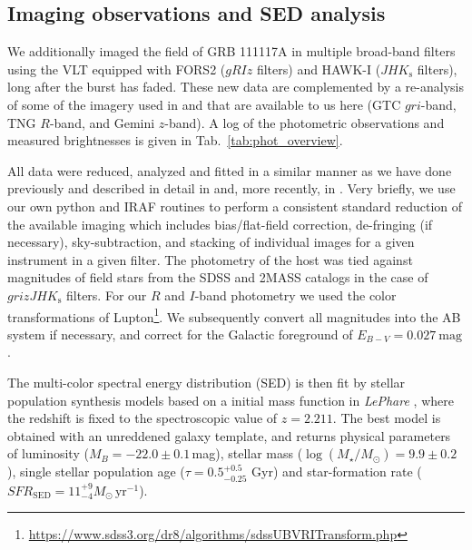 \documentclass{aa}    %
\begin{document}


\subsection{Imaging observations and SED analysis} \label{SED}

We additionally imaged the field of GRB 111117A in multiple broad-band filters
using the VLT equipped with FORS2 ($gRIz$ filters) and HAWK-I
($JHK_{\mathrm{s}}$ filters), long after the burst has faded. These new data are
complemented by a re-analysis of some of the imagery used in
\citet{Margutti2012} and \citet{Sakamoto2013} that are available to us here (GTC
$gri$-band, TNG $R$-band, and Gemini $z$-band). A log of the photometric
observations and measured brightnesses is given in Tab.~\ref{tab:phot_overview}.

All data were reduced, analyzed and fitted in a similar manner as we have done
previously and described in detail in \citet{Kruhler2011a} and, more recently,
in \citet{Schulze2016}. Very briefly, we use our own python and IRAF routines to
perform a consistent standard reduction of the available imaging which includes
bias/flat-field correction, de-fringing (if necessary), sky-subtraction, and
stacking of individual images for a given instrument in a given filter. The
photometry of the host was tied against magnitudes of field stars from the SDSS
and 2MASS catalogs in the case of $grizJHK_{\mathrm{s}}$ filters. For our $R$
and $I$-band photometry we used the color transformations of
Lupton\footnote{\url{https://www.sdss3.org/dr8/algorithms/sdssUBVRITransform.php}}. We subsequently convert all magnitudes into the AB system if necessary, and correct for the Galactic foreground of $E_{B-V}=0.027~\mathrm{mag}$.

The multi-color spectral energy distribution (SED) is then fit by
\citet{Bruzual2003} stellar population synthesis models based on a
\citet{Chabrier2003} initial mass function in \emph{LePhare} \citep{Ilbert2006},
where the redshift is fixed to the spectroscopic value of $z=2.211$. The best
model is obtained with an unreddened galaxy template, and returns physical
parameters of luminosity ($M_B=-22.0\pm0.1$\,mag), stellar mass
($\log(M_{\star}/M_\odot) = 9.9\pm0.2$), single stellar population age ($\tau =
0.5_{-0.25}^{+0.5}$ Gyr) and star-formation rate
($SFR_{\mathrm{SED}}=11_{-4}^{+9} M_\odot\,\mathrm{yr}^{-1}$). %
\end{document}
